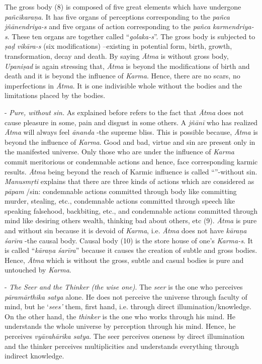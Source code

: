 The gross body (8) is composed of five great elements which have undergone \emph{pañcīkaraṇa}. It has five organs of perceptions corresponding to the \emph{pañca jñānendriya-s} and five organs of action corresponding to the \emph{pañca karmendriya-s}. These ten organs are together called ``\emph{golaka-s}''. The gross body is subjected to \emph{ṣaḍ vikāra-s} (six modifications) --existing in potential form, birth, growth, transformation, decay and death. By saying \emph{Ātma} is without gross body, \emph{Upaniṣad} is again stressing that, \emph{Ātma} is beyond the modifications of birth and death and it is beyond the influence of \emph{Karma}. Hence, there are no scars, no imperfections in \emph{Ātma}. It is one indivisible whole without the bodies and the limitations placed by the bodies.

- \emph{Pure, without sin.} As explained before  refers to the fact that \emph{Ātma} does not cause pleasure in some, pain and disgust in some others. A \emph{jñānī} who has realized \emph{Ātma} will always feel \emph{ānanda} -the supreme bliss. This is possible because, \emph{Ātma} is beyond the influence of \emph{Karma}. Good and bad, virtue and sin are present only in the manifested universe. Only those who are under the influence of \emph{Karma} commit meritorious or condemnable actions and hence, face corresponding karmic results. \emph{Ātma} being beyond the reach of Karmic influence is called ``''-without sin. \emph{Manusmṛti} explains that there are three kinds of actions which are considered as \emph{pāpam} /sin: condemnable actions committed through body like committing murder, stealing, etc., condemnable actions committed through speech like speaking falsehood, backbiting, etc., and condemnable actions committed through mind like desiring others wealth, thinking bad about others, etc (9). \emph{Ātma} is pure and without sin because it is devoid of \emph{Karma}, i.e. \emph{Ātma} does not have \emph{kāraṇa śarīra} -the causal body. Causal body (10) is the store house of one's \emph{Karma-s}. It is called ``\emph{kāraṇa śarīra}'' because it causes the creation of subtle and gross bodies. Hence, \emph{Ātma} which is without the gross, subtle and casual bodies is pure and untouched by \emph{Karma}.

 - \emph{The Seer and the Thinker (the wise one)}. The \emph{seer} is the one who perceives \emph{pāramārthika satya} alone. He does not perceive the universe through faculty of mind, but he `\emph{sees'} them, first hand, i.e. through direct illumination/knowledge. On the other hand, the \emph{thinker} is the one who works through his mind. He understands the whole universe by perception through his mind. Hence, he perceives \emph{vyāvahārika satya}. The seer perceives oneness by direct illumination and the thinker perceives multiplicities and understands everything through indirect knowledge.

